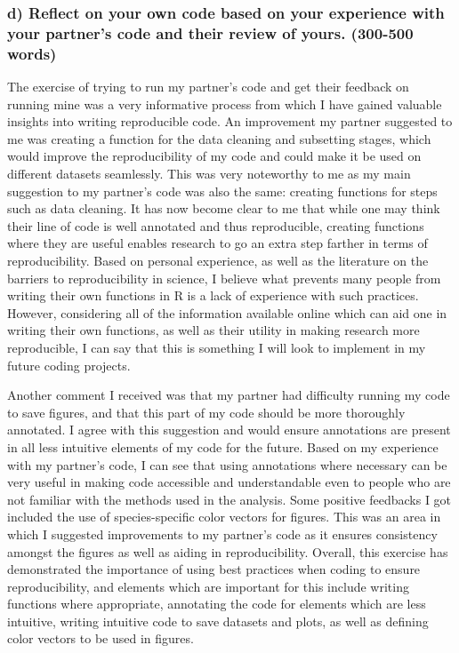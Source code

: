 \documentclass[
]{article}
\begin{document}
\subsubsection{d) Reflect on your own code based on your experience with
your partner's code and their review of yours. (300-500
words)}\label{d-reflect-on-your-own-code-based-on-your-experience-with-your-partners-code-and-their-review-of-yours.-300-500-words}

The exercise of trying to run my partner's code and get their feedback
on running mine was a very informative process from which I have gained
valuable insights into writing reproducible code. An improvement my
partner suggested to me was creating a function for the data cleaning
and subsetting stages, which would improve the reproducibility of my
code and could make it be used on different datasets seamlessly. This
was very noteworthy to me as my main suggestion to my partner's code was
also the same: creating functions for steps such as data cleaning. It
has now become clear to me that while one may think their line of code
is well annotated and thus reproducible, creating functions where they
are useful enables research to go an extra step farther in terms of
reproducibility. Based on personal experience, as well as the literature
on the barriers to reproducibility in science, I believe what prevents
many people from writing their own functions in R is a lack of
experience with such practices. However, considering all of the
information available online which can aid one in writing their own
functions, as well as their utility in making research more
reproducible, I can say that this is something I will look to implement
in my future coding projects.~

Another comment I received was that my partner had difficulty running my
code to save figures, and that this part of my code should be more
thoroughly annotated. I agree with this suggestion and would ensure
annotations are present in all less intuitive elements of my code for
the future. Based on my experience with my partner's code, I can see
that using annotations where necessary can be very useful in making code
accessible and understandable even to people who are not familiar with
the methods used in the analysis. Some positive feedbacks I got included
the use of species-specific color vectors for figures. This was an area
in which I suggested improvements to my partner's code as it ensures
consistency amongst the figures as well as aiding in reproducibility.
Overall, this exercise has demonstrated the importance of using best
practices when coding to ensure reproducibility, and elements which are
important for this include writing functions where appropriate,
annotating the code for elements which are less intuitive, writing
intuitive code to save datasets and plots, as well as defining color
vectors to be used in figures.~
\end{document}
